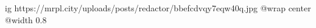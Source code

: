  
 
 
 
 

\ifcmt
  ig https://mrpl.city/uploads/posts/redactor/bbefcdvqy7eqw40q.jpg
  @wrap center
  @width 0.8
\fi
